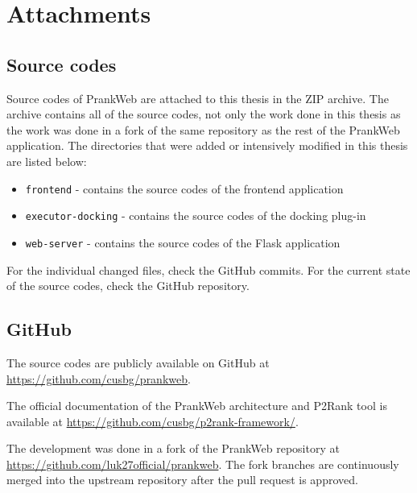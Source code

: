 \chapter{Attachments}

\section{Source codes}
\label{sec:source_codes}

Source codes of PrankWeb are attached to this thesis in the ZIP archive. The archive contains all of the source codes, not only the work done in this thesis as the work was done in a fork of the same repository as the rest of the PrankWeb application. The directories that were added or intensively modified in this thesis are listed below:
\begin{itemize}
    \item \texttt{frontend} - contains the source codes of the frontend application
    \item \texttt{executor-docking} - contains the source codes of the docking plug-in
    \item \texttt{web-server} - contains the source codes of the Flask application
\end{itemize}

For the individual changed files, check the GitHub commits. For the current state of the source codes, check the GitHub repository.

\section{GitHub}
\label{sec:github}

The source codes are publicly available on GitHub at \url{https://github.com/cusbg/prankweb}.

The official documentation of the PrankWeb architecture and P2Rank tool is available at \url{https://github.com/cusbg/p2rank-framework/}.

The development was done in a fork of the PrankWeb repository at \url{https://github.com/luk27official/prankweb}. The fork branches are continuously merged into the upstream repository after the pull request is approved.  

\pagebreak
